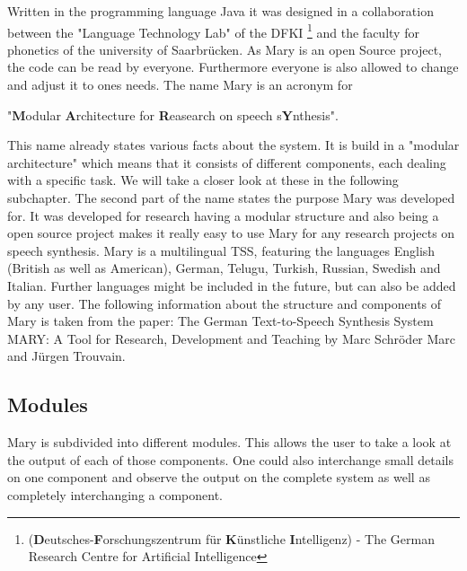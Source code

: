 \documentclass[a4paper, 12pt]{article}
\begin{document}
Written in the programming language Java it was designed in a collaboration between the  "Language Technology Lab" of the DFKI \footnote {(\textbf{D}eutsches-\textbf{F}orschungszentrum für \textbf{K}ünstliche \textbf{I}ntelligenz) - The German Research Centre for Artificial Intelligence} and the faculty for phonetics of the university of Saarbrücken.
As Mary is an open Source project, the code can be read by everyone. Furthermore everyone is also allowed to change and adjust it to ones needs.\newline \newline
The name Mary is an acronym for \newline 
\begin{center}"\textbf{M}odular \textbf{A}rchitecture for \textbf{R}easearch on speech s\textbf{Y}nthesis".\end{center}
This name already states various facts about the system. 
It is build in a "modular architecture" which means that it consists of different components, each dealing with a specific task. We will take a closer look at these in the following subchapter.
The second part of the name states the purpose Mary was developed for.
It was developed for research having a modular structure and also being a open source project makes it really easy to use Mary for any research projects on speech synthesis. \newline \newline
Mary is a multilingual TSS, featuring the languages English (British as well as American), German, Telugu, Turkish, Russian, Swedish and Italian. 
Further languages might be included in the future, but can also be added by any user. \newline \newline
The following information about the structure and components of Mary is taken from the paper: 
The German Text-to-Speech Synthesis System MARY:
A Tool for Research, Development and Teaching by Marc Schröder Marc and Jürgen Trouvain.

\subsection{Modules}

Mary is subdivided into different modules. 
This allows the user to take a look at the output of each of those components. 
One could also interchange small details on one component and observe the output on the complete system as well as completely interchanging a component.
\end{document}

